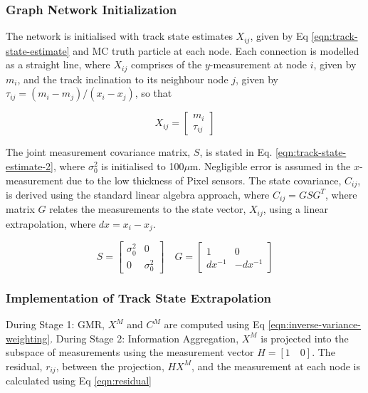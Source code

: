 \subsubsection{Graph Network Initialization}

The network is initialised with track state estimates $X_{ij}$, given by Eq \eqref{eqn:track-state-estimate} and MC truth particle at each node. Each connection is modelled as a straight line, where $X_{ij}$ comprises of the $y$-measurement at node $i$, given by $m_i$, and the track inclination to its neighbour node $j$, given by $\tau_{ij} = (m_i - m_j) / (x_i - x_j)$, so that

\begin{equation}
X_{ij} = \begin{bmatrix} m_i \\ \tau_{ij} \end{bmatrix}
\label{eqn:track-state-estimate}
\end{equation}


The joint measurement covariance matrix, $S$, is stated in Eq. \eqref{eqn:track-state-estimate-2}, where $\sigma_0^{2}$ is initialised to 100$\mu$m. Negligible error is assumed in the $x$-measurement due to the low thickness of Pixel sensors. The state covariance, $C_{ij}$, is derived using the standard linear algebra approach, where $C_{ij} = GSG^T$, where matrix $G$ relates the measurements to the state vector, $X_{ij}$, using a linear extrapolation, where $dx = x_i - x_j$.  

\begin{equation}
S = \begin{bmatrix} \sigma_0^{2} & 0 \\ 0 & \sigma_0^{2} \end{bmatrix}  \quad G = \begin{bmatrix} 1 & 0 \\ dx^{-1} & -dx^{-1}  \end{bmatrix}
\label{eqn:track-state-estimate-2}
\end{equation}


\subsubsection{Implementation of Track State Extrapolation}

During Stage 1: GMR, $X^{M}$ and $C^{M}$ are computed using Eq \eqref{eqn:inverse-variance-weighting}. During Stage 2: Information Aggregation, $X^M$ is projected into the subspace of measurements using the measurement vector $H = [1 \quad 0]$. The residual, $r_{ij}$, between the projection, $HX^M$, and the measurement at each node is calculated using Eq \eqref{eqn:residual}

